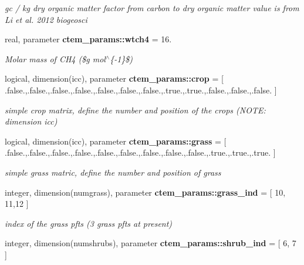 \begin{DoxyCompactItemize}
\begin{DoxyCompactList}\small\item\em gc / kg dry organic matter  factor from carbon to dry organic matter value is from Li et al. 2012 biogeosci \end{DoxyCompactList}\item 
\hypertarget{namespacectem__params_a5246c472162b5b9f071d4e55d87ee84c}{}real, parameter {\bfseries ctem\+\_\+params\+::wtch4} = 16.\label{namespacectem__params_a5246c472162b5b9f071d4e55d87ee84c}

\begin{DoxyCompactList}\small\item\em Molar mass of C\+H4 (\$g mol$^\wedge$\{-\/1\}\$) \end{DoxyCompactList}\item 
\hypertarget{namespacectem__params_ae0f698eacc7fc8a7cfd68a15a90b4e8f}{}logical, dimension(icc), parameter {\bfseries ctem\+\_\+params\+::crop} = \mbox{[} .false.,.false.,.false.,.false.,.false.,.false.,.false.,.true.,.true.,.false.,.false.,.false. \mbox{]}\label{namespacectem__params_ae0f698eacc7fc8a7cfd68a15a90b4e8f}

\begin{DoxyCompactList}\small\item\em simple crop matrix, define the number and position of the crops (N\+O\+T\+E\+: dimension icc) \end{DoxyCompactList}\item 
\hypertarget{namespacectem__params_aa3cfb14989b4145f054926e8eea3382f}{}logical, dimension(icc), parameter {\bfseries ctem\+\_\+params\+::grass} = \mbox{[} .false.,.false.,.false.,.false.,.false.,.false.,.false.,.false.,.false.,.true.,.true.,.true. \mbox{]}\label{namespacectem__params_aa3cfb14989b4145f054926e8eea3382f}

\begin{DoxyCompactList}\small\item\em simple grass matric, define the number and position of grass \end{DoxyCompactList}\item 
\hypertarget{namespacectem__params_ac0e6330dd6b8408f75fb25c1a7aa7fcb}{}integer, dimension(numgrass), parameter {\bfseries ctem\+\_\+params\+::grass\+\_\+ind} = \mbox{[} 10, 11,12 \mbox{]}\label{namespacectem__params_ac0e6330dd6b8408f75fb25c1a7aa7fcb}

\begin{DoxyCompactList}\small\item\em index of the grass pfts (3 grass pfts at present) \end{DoxyCompactList}\item 
\hypertarget{namespacectem__params_aec72ba91dc7f74a089a1dfd41f940640}{}integer, dimension(numshrubs), parameter {\bfseries ctem\+\_\+params\+::shrub\+\_\+ind} = \mbox{[} 6, 7 \mbox{]}\label{namespacectem__params_aec72ba91dc7f74a089a1dfd41f940640}


\end{DoxyCompactItemize}
